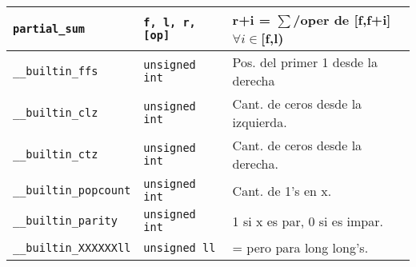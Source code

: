 \begin{center}
{\begin{xtabular}{|L{.4\columnwidth}|C{.22\columnwidth}|L{.4\columnwidth}|}
  \texttt{partial\_sum} & \texttt{f, l, r, [op]} & r+i = $\sum$/oper de [f,f+i] $\forall i \in$[f,l)\\\hline
  \texttt{\_\_builtin\_ffs} &  \texttt{unsigned int} & Pos. del primer 1 desde la derecha\\\hline
  \texttt{\_\_builtin\_clz} &  \texttt{unsigned int} & Cant. de ceros desde la izquierda.\\\hline
  \texttt{\_\_builtin\_ctz} &  \texttt{unsigned int} & Cant. de ceros desde la derecha.\\\hline
  \texttt{\_\_builtin\_popcount} &  \texttt{unsigned int} & Cant. de 1’s en x.\\\hline
  \texttt{\_\_builtin\_parity} &  \texttt{unsigned int} & 1 si x es par, 0 si es impar.\\\hline
  \texttt{\_\_builtin\_XXXXXXll} &  \texttt{unsigned ll} & = pero para long long's.\\\hline
  \end{xtabular}
}
\end{center}